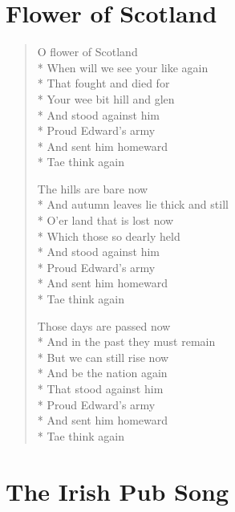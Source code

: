 \documentclass[9pt,twoside]{extarticle}
\newenvironment{xverse}{
	\begin{verse}
	\fontsize{8.5}{10.5}\selectfont
	}
	{
	\end{verse}
	\penalty 0
}
\begin{document}
\section{Flower of Scotland}

\begin{xverse}
O flower of Scotland \\*
When will we see your like again \\*
That fought and died for \\*
Your wee bit hill and glen \\*
And stood against him \\*
Proud Edward’s army \\*
And sent him homeward \\*
Tae think again

The hills are bare now \\*
And autumn leaves lie thick and still \\*
O’er land that is lost now \\*
Which those so dearly held \\*
And stood against him \\*
Proud Edward’s army \\*
And sent him homeward \\*
Tae think again

Those days are passed now \\*
And in the past they must remain \\*
But we can still rise now \\*
And be the nation again \\*
That stood against him \\*
Proud Edward’s army \\*
And sent him homeward \\*
Tae think again
\end{xverse}


\section{The Irish Pub Song}
\end{document}
